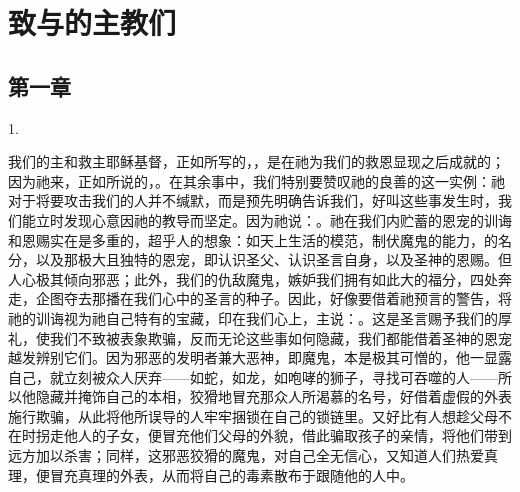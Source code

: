 
\chapter{致与的主教们}



\section{第一章}

1. \par

我们的主和救主耶稣基督，正如所写的，，是在祂为我们的救恩显现之后成就的；因为祂来，正如所说的，。在其余事中，我们特别要赞叹祂的良善的这一实例：祂对于将要攻击我们的人并不缄默，而是预先明确告诉我们，好叫这些事发生时，我们能立时发现心意因祂的教导而坚定。因为祂说：。祂在我们内贮蓄的恩宠的训诲和恩赐实在是多重的，超乎人的想象：如天上生活的模范，制伏魔鬼的能力，的名分，以及那极大且独特的恩宠，即认识圣父、认识圣言自身，以及圣神的恩赐。但人心极其倾向邪恶；此外，我们的仇敌魔鬼，嫉妒我们拥有如此大的福分，四处奔走，企图夺去那播在我们心中的圣言的种子。因此，好像要借着祂预言的警告，将祂的训诲视为祂自己特有的宝藏，印在我们心上，主说：。这是圣言赐予我们的厚礼，使我们不致被表象欺骗，反而无论这些事如何隐藏，我们都能借着圣神的恩宠越发辨别它们。因为邪恶的发明者兼大恶神，即魔鬼，本是极其可憎的，他一显露自己，就立刻被众人厌弃——如蛇，如龙，如咆哮的狮子，寻找可吞噬的人——所以他隐藏并掩饰自己的本相，狡猾地冒充那众人所渴慕的名号，好借着虚假的外表施行欺骗，从此将他所误导的人牢牢捆锁在自己的锁链里。又好比有人想趁父母不在时拐走他人的子女，便冒充他们父母的外貌，借此骗取孩子的亲情，将他们带到远方加以杀害；同样，这邪恶狡猾的魔鬼，对自己全无信心，又知道人们热爱真理，便冒充真理的外表，从而将自己的毒素散布于跟随他的人中。\par

